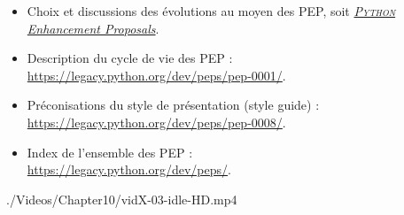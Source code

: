 \begin{gofurther}
\begin{itemize}
\end{itemize}
\begin{itemize}\jazzitem
	\item Choix et discussions des évolutions au moyen des PEP, soit \href{https://en.wikipedia.org/wiki/Python_(programming_language)#Development}{\textit{\textsc{Python} Enhancement Proposals}}.
	\item Description du cycle de vie des PEP :\\ \url{https://legacy.python.org/dev/peps/pep-0001/}.
	\item Préconisations du style de présentation (style guide) :\\ \url{https://legacy.python.org/dev/peps/pep-0008/}.
	\item Index de l'ensemble des PEP :\\ \url{https://legacy.python.org/dev/peps/}.
\end{itemize}
\end{gofurther}


\begin{marginvideo}
	\vspace*{-6cm}%
		{./Videos/Chapter10/vidX-03-idle-HD.mp4}%
\end{marginvideo}


